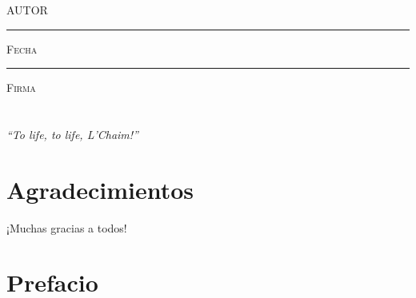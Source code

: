 \documentclass[11pt]{book}
\begin{document}
\centering

\hspace{3em}

\textsc{AUTOR}

\vspace{5em}

\rule[1em]{20em}{0.5pt} %

\textsc{Fecha}
 
\vspace{8em}

\rule[1em]{20em}{0.5pt} %

\textsc{Firma}

\endgroup
\vspace*{\fill}



\pagestyle{empty}
\frontmatter

\chapter*{}
\begin{flushright}
\textit{``To life, to life, L'Chaim!''}
\end{flushright}



\chapter*{Agradecimientos}

¡Muchas gracias a todos!



\chapter*{Prefacio}

\pagestyle{plain}
\end{document}
